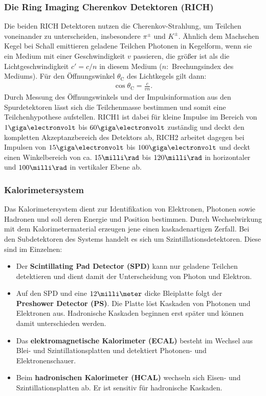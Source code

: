\subsubsection{Die Ring Imaging Cherenkov Detektoren (RICH)}
Die beiden RICH Detektoren nutzen die Cherenkov-Strahlung, um Teilchen voneinander zu unterscheiden, insbesondere $\pi^{\pm}$ und $K^{\pm}$. Ähnlich dem Machschen Kegel bei Schall emittieren geladene Teilchen Photonen in Kegelform, wenn sie ein Medium mit einer Geschwindigkeit $v$ passieren, die größer ist als die Lichtgeschwindigkeit $c'=c/n$ in diesem Medium ($n:$ Brechungsindex des Mediums). Für den Öffnungswinkel $\theta_{\text{C}}$ des Lichtkegels gilt dann:
\begin{align}
\cos \theta_{\text{C}} = \frac{c}{vn}.
\end{align}
Durch Messung des Öffnungswinkels und der Impulsinformation aus den Spurdetektoren lässt sich die Teilchenmasse bestimmen und somit eine Teilchenhypothese aufstellen. RICH1 ist dabei für kleine Impulse im Bereich von $1\giga\electronvolt$ bis $60\giga\electronvolt$ zuständig und deckt den kompletten Akzeptanzbereich des Detektors ab, RICH2 arbeitet dagegen bei Impulsen von $15\giga\electronvolt$ bis $100\giga\electronvolt$ und deckt einen Winkelbereich von ca. $15\milli\rad$ bis $120\milli\rad$ in horizontaler und $100\milli\rad$ in vertikaler Ebene ab.

\subsubsection{Kalorimetersystem}
Das Kalorimetersystem dient zur Identifikation von Elektronen, Photonen sowie Hadronen und soll deren Energie und Position bestimmen. Durch Wechselwirkung mit dem Kalorimetermaterial erzeugen jene einen kaskadenartigen Zerfall. Bei den Subdetektoren des Systems handelt es sich um Szintillationsdetektoren. Diese sind im Einzelnen:
\begin{itemize}
\item Der \textbf{Scintillating Pad Detector (SPD)} kann nur geladene Teilchen detektieren und dient damit der Unterscheidung von Photon und Elektron.
\item Auf den SPD und eine $12\milli\meter$ dicke Bleiplatte folgt der \textbf{Preshower Detector (PS)}. Die Platte löst Kaskaden von Photonen und Elektronen aus. Hadronische Kaskaden beginnen erst später und können damit unterschieden werden.
\item Das \textbf{elektromagnetische Kalorimeter (ECAL)} besteht im Wechsel aus Blei- und Szintillationsplatten und detektiert Photonen- und Elektronenschauer.
\item Beim \textbf{hadronischen Kalorimeter (HCAL)} wechseln sich Eisen- und Szintillationsplatten ab. Er ist sensitiv für hadronische Kaskaden.
\end{itemize}

